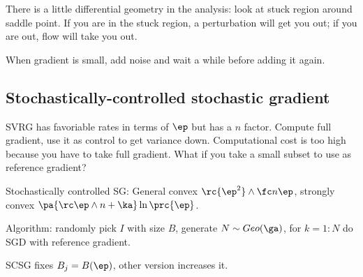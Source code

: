 There is a little differential geometry in the analysis: look at stuck region around saddle point. If you are in the stuck region, a perturbation will get you out; if you are out, flow will take you out.

When gradient is small, add noise and wait a while before adding it again.


\subsection{Stochastically-controlled stochastic gradient}

SVRG has favoriable rates in terms of $\ep$ but has a $n$ factor. Compute full gradient, use it as control to get variance down. Computational cost is too high because you have to take full gradient.
What if you take a small subset to use as reference gradient?

Stochastically controlled SG: General convex $\rc{\ep^2}\wedge \fc n\ep$, strongly convex $\pa{\rc \ep \wedge n + \ka} \ln \prc{\ep}$. 

Algorithm: randomly pick $I$ with size $B$, generate $N\sim Geo(\ga)$, for $k=1:N$ do SGD with reference gradient.

SCSG fixes $B_j=B(\ep)$, other  version increases it.